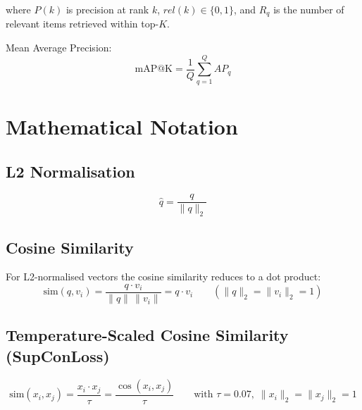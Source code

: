 \documentclass[11pt,a4paper]{article}
\begin{document}
where $P(k)$ is precision at rank $k$, $rel(k) \in \{0,1\}$, and $R_q$ is the number of relevant items retrieved within top-$K$.

Mean Average Precision:
\begin{equation}
\mathrm{mAP@K} = \frac{1}{Q}\sum_{q=1}^{Q} AP_q
\end{equation}

\section{Mathematical Notation}
\label{app:notation}

\subsection*{L2 Normalisation}

\begin{equation}
\hat{q} = \frac{q}{\|q\|_2}
\end{equation}

\subsection*{Cosine Similarity}

For L2-normalised vectors the cosine similarity reduces to a dot product:
\begin{equation}
\mathrm{sim}(q, v_i) = \frac{q \cdot v_i}{\|q\|\,\|v_i\|} = q \cdot v_i
\qquad (\|q\|_2 = \|v_i\|_2 = 1)
\end{equation}

\subsection*{Temperature-Scaled Cosine Similarity (SupConLoss)}

\begin{equation}
\mathrm{sim}(x_i, x_j) =
\frac{x_i \cdot x_j}{\tau}
= \frac{\cos(x_i, x_j)}{\tau}
\qquad \text{with } \tau = 0.07,\;\|x_i\|_2 = \|x_j\|_2 = 1
\end{equation}
\end{document}
